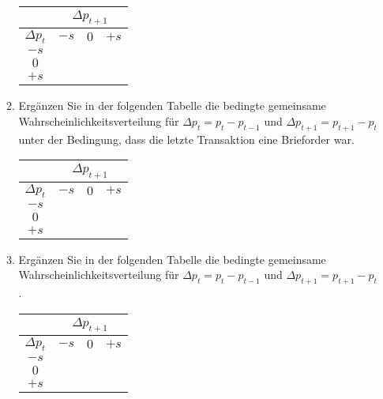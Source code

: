 \begin{enumerate}
\begin{enumerate}
\begin{center}%
\begin{tabular}{c|ccc}
& \multicolumn{3}{|c}{$\Delta p_{t+1}$} \\ \hline
$\Delta p_{t}$ & $-s$ & $0$ & $+s$ \\ \hline
$-s$ & \rule[-0.15cm]{0cm}{0.6cm}\qquad & \qquad & \qquad \\ 
$0$ & \rule[-0.15cm]{0cm}{0.6cm} &  &  \\ 
$+s$ & \rule[-0.15cm]{0cm}{0.6cm} &  & 
\end{tabular}%
\end{center}%

\item Erg\"{a}nzen Sie in der folgenden Tabelle die bedingte gemeinsame
Wahr\-schein\-lich\-keits\-ver\-tei\-lung f\"{u}r $\Delta p_{t}=p_{t}-p_{t-1}
$ und $\Delta p_{t+1}=p_{t+1}-p_{t}$ unter der Bedingung, dass die letzte
Transaktion eine Brieforder war.

\begin{center}%
\begin{tabular}{c|ccc}
& \multicolumn{3}{|c}{$\Delta p_{t+1}$} \\ \hline
$\Delta p_{t}$ & $-s$ & $0$ & $+s$ \\ \hline
$-s$ & \rule[-0.15cm]{0cm}{0.6cm}\qquad  & \qquad  & \qquad  \\ 
$0$ & \rule[-0.15cm]{0cm}{0.6cm} &  &  \\ 
$+s$ & \rule[-0.15cm]{0cm}{0.6cm} &  & 
\end{tabular}%
\end{center}%

\item Erg\"{a}nzen Sie in der folgenden Tabelle die bedingte gemeinsame
Wahr\-schein\-lich\-keits\-ver\-tei\-lung f\"{u}r $\Delta p_{t}=p_{t}-p_{t-1}
$ und $\Delta p_{t+1}=p_{t+1}-p_{t}$.

\begin{center}%
\begin{tabular}{c|ccc}
& \multicolumn{3}{|c}{$\Delta p_{t+1}$} \\ \hline
$\Delta p_{t}$ & $-s$ & $0$ & $+s$ \\ \hline
$-s$ & \rule[-0.15cm]{0cm}{0.6cm}\qquad  & \qquad  & \qquad  \\ 
$0$ & \rule[-0.15cm]{0cm}{0.6cm} &  &  \\ 
$+s$ & \rule[-0.15cm]{0cm}{0.6cm} &  & 
\end{tabular}%
\end{center}%


\end{enumerate}
\end{enumerate}
